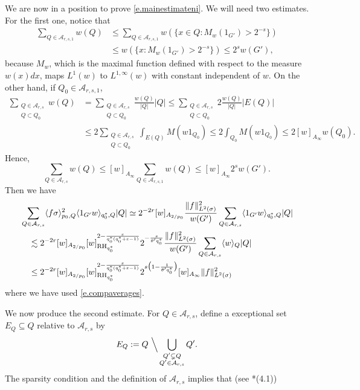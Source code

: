 \documentclass[11pt,reqno]{amsart}
\theoremstyle{plain} %
\newcommand{\1}{ \mathbbm{1}}   %
\theoremstyle{definition}
\theoremstyle{remark}
\numberwithin{equation}{section}
\begin{document}
We are now in a position to prove \eqref{e.mainestimateni}. We will need two estimates. For the first one, notice that 
\begin{align*}
\sum_{Q\in\mathcal A_{r,s,1}}w(Q) &\leq \sum_{Q\in\mathcal A_{r,s,1}}w(\{x\in Q:M_w(1_{G'})>2^{-s}\}) \\ &\leq w(\{x:M_w(1_{G'})>2^{-s}\}) \leq 2^sw(G'),
\end{align*}
because $M_w$, which is the maximal function defined with respect to the measure $w(x)dx$, maps $L^1(w)$ to $ L^{1,\infty}(w)$ with constant independent of $w$. On the other hand, if $Q_0\in \mathcal A_{r,s,1}$,
\begin{align*}
\sum_{\substack{Q\in \mathcal{A}_{r,s}\\ Q\subset Q_0} } w(Q) & = \sum_{\substack{Q\in \mathcal{A}_{r,s}\\ Q\subset Q_0 }} \frac{w(Q)}{|Q|}|Q|  \leq \sum_{\substack{Q\in \mathcal{A}_{r,s}\\ Q\subset Q_0} } 2\frac{w(Q)}{|Q|}|E(Q)|\\
&\leq 2  \sum_{\substack{Q\in \mathcal{A}_{r,s}\\ Q\subset Q_0 }} \int_{E(Q)} M(w1_{Q_0}) \leq 2 \int_{Q_0} M(w1_{Q_0})\leq 2[w]_{A_{\infty}}w(Q_0).
\end{align*}
Hence,
$$
\sum_{Q\in\mathcal A_{r,s}}w(Q)\leq [w]_{A_{\infty}}\sum_{Q\in\mathcal A_{r,s,1}}w(Q)\leq  [w]_{A_{\infty}}2^sw(G').
$$
Then we have 
\begin{align}\label{estimate1ni}
\notag&\sum_{Q\in\mathcal A_{r,s}} \langle f \sigma \rangle_{p_0, Q}^2 \langle 1_{G'} w \rangle_{q_0^*, Q}|Q|  \simeq 2^{-2r}[w]_{A_{2/p_0}} \frac{\| f\| _{L^{2}(\sigma)}^{2}}{w(G')}\sum_{Q\in\mathcal A_{r,s}} \langle 1_{G'} w \rangle_{q_0^*, Q}|Q|  \\
\notag&\quad\lesssim 2^{-2r}[w]_{A_{2/p_0}}[w]_{\operatorname{RH}_{q_0^*}}^{2-\frac{\varepsilon}{q_0^*(q_0^*+\varepsilon-1)}}2^{-\frac{s}{\theta'q_0^*}}\frac{\| f\| _{L^{2}(\sigma)}^{2}}{w(G')}\sum_{Q\in\mathcal A_{r,s}}  \langle w\rangle_Q|Q| \\
&\quad \leq  2^{-2r}[w]_{A_{2/p_0}}[w]_{\operatorname{RH}_{q_0^*}}^{2-\frac{\varepsilon}{q_0^*(q_0^*+\varepsilon-1)}}2^{s\big(1-\frac{1}{\theta' q_0^*}\big)}[w]_{A_{\infty}}\| f\| _{L^{2}(\sigma)}^{2}
\end{align}
\color{black}
where we have used \eqref{e.compaverages}. 


We now produce the second estimate.  For $Q \in \mathcal{A}_{r,s}$, define a exceptional set $E_Q \subseteq Q$ relative to $\mathcal{A}_{r,s}$ by
$$
E_Q : = Q\  \Big\backslash \bigcup_{\substack{ Q' \subsetneq Q \\ Q' \in \mathcal{A}_{r,s}}} Q'.
$$
The sparsity condition and the definition of $ \mathcal{A}_{r,s}$ implies that (see \cite{DLR}*{(4.1)}) 
\end{document}
